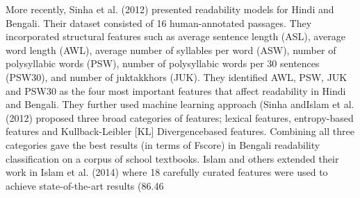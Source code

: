 \documentclass[9pt]{article}
\begin{document}
More recently, Sinha et al. (2012) presented readability models for Hindi and Bengali. Their dataset consisted of 16 human-annotated passages. They incorporated structural features such as average sentence length (ASL), average word length (AWL), average number of syllables per word (ASW), number of polysyllabic words (PSW), number of polysyllabic words per 30 sentences (PSW30), and number of juktakkhors (JUK). They identiﬁed AWL, PSW, JUK and PSW30 as the four most important features that aﬀect readability in Hindi and Bengali. They further used machine learning approach (Sinha andIslam et al. (2012) proposed three broad categories of features; lexical features, entropy-based features and Kullback-Leibler [KL] Divergencebased features. Combining all three categories gave the best results (in terms of Fscore) in Bengali readability classiﬁcation on a corpus of school textbooks. Islam and others extended their work in Islam et al. (2014) where 18 carefully curated features were used to achieve state-of-the-art results (86.46%
\\
\end{document}

